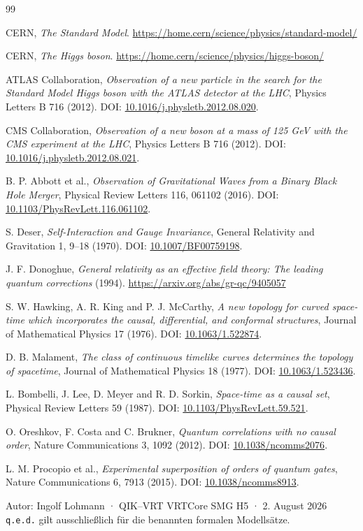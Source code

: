 \documentclass[11pt,a4paper]{article}
\newcommand{\QIKVRT}{QIK--VRT}
\newcommand{\code}[1]{\texttt{#1}}
\begin{document}
\begin{thebibliography}{99}

CERN, \emph{The Standard Model}.\newline
\url{https://home.cern/science/physics/standard-model/}

CERN, \emph{The Higgs boson}.\newline
\url{https://home.cern/science/physics/higgs-boson/}

ATLAS Collaboration, \emph{Observation of a new particle in the search for the
Standard Model Higgs boson with the ATLAS detector at the LHC}, Physics Letters
B 716 (2012). DOI: \href{https://doi.org/10.1016/j.physletb.2012.08.020}{10.1016/j.physletb.2012.08.020}.

CMS Collaboration, \emph{Observation of a new boson at a mass of 125 GeV with
the CMS experiment at the LHC}, Physics Letters B 716 (2012). DOI:
\href{https://doi.org/10.1016/j.physletb.2012.08.021}{10.1016/j.physletb.2012.08.021}.

B. P. Abbott et al., \emph{Observation of Gravitational Waves from a Binary
Black Hole Merger}, Physical Review Letters 116, 061102 (2016). DOI:
\href{https://doi.org/10.1103/PhysRevLett.116.061102}{10.1103/PhysRevLett.116.061102}.

S. Deser, \emph{Self-Interaction and Gauge Invariance}, General Relativity and
Gravitation 1, 9--18 (1970). DOI:
\href{https://doi.org/10.1007/BF00759198}{10.1007/BF00759198}.

J. F. Donoghue, \emph{General relativity as an effective field theory: The
leading quantum corrections} (1994).\newline
\url{https://arxiv.org/abs/gr-qc/9405057}

S. W. Hawking, A. R. King and P. J. McCarthy, \emph{A new topology for curved
space-time which incorporates the causal, differential, and conformal
structures}, Journal of Mathematical Physics 17 (1976). DOI:
\href{https://doi.org/10.1063/1.522874}{10.1063/1.522874}.

D. B. Malament, \emph{The class of continuous timelike curves determines the
topology of spacetime}, Journal of Mathematical Physics 18 (1977). DOI:
\href{https://doi.org/10.1063/1.523436}{10.1063/1.523436}.

L. Bombelli, J. Lee, D. Meyer and R. D. Sorkin, \emph{Space-time as a causal
set}, Physical Review Letters 59 (1987). DOI:
\href{https://doi.org/10.1103/PhysRevLett.59.521}{10.1103/PhysRevLett.59.521}.

O. Oreshkov, F. Costa and C. Brukner, \emph{Quantum correlations with no causal
order}, Nature Communications 3, 1092 (2012). DOI:
\href{https://doi.org/10.1038/ncomms2076}{10.1038/ncomms2076}.

L. M. Procopio et al., \emph{Experimental superposition of orders of quantum
gates}, Nature Communications 6, 7913 (2015). DOI:
\href{https://doi.org/10.1038/ncomms8913}{10.1038/ncomms8913}.

\end{thebibliography}

\vfill
\begin{center}
\small
Autor: Ingolf Lohmann · \QIKVRT{} VRTCore SMG H5 · 2. August 2026\\
\code{q.e.d.} gilt ausschließlich für die benannten formalen Modellsätze.
\end{center}
\end{document}
